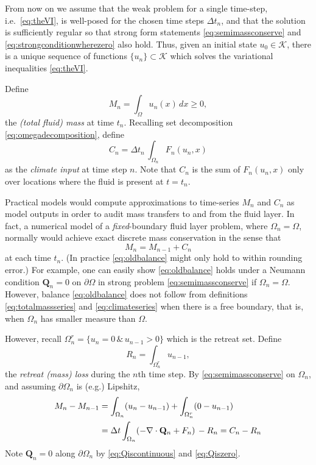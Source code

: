 \documentclass[final,leqno,onefignum,onetabnum]{siamltex1213bueler}
\newcommand\bQ{\mathbf{Q}}
\newcommand{\Div}{\nabla\cdot}
\begin{document}
From now on we assume that the weak problem for a single time-step, i.e.~\eqref{eq:theVI}, is well-posed for the chosen time steps $\Delta t_n$, and that the solution is sufficiently regular so that strong form statements \eqref{eq:semimassconserve} and \eqref{eq:strongconditionwherezero} also hold.  Thus, given an initial state $u_0\in\mathcal{K}$, there is a unique sequence of functions $\{u_n\} \subset \mathcal{K}$ which solves the variational inequalities \eqref{eq:theVI}.

Define
\begin{equation}
M_n = \int_\Omega u_n(x)\,dx \ge 0, \label{eq:totalmassseries}
\end{equation}
the \emph{(total fluid) mass} at time $t_n$.  Recalling set decomposition \eqref{eq:omegadecomposition}, define
\begin{equation}
C_n = \Delta t_n\, \int_{\Omega_n} F_n(u_n,x) \label{eq:climateseries}
\end{equation}
as the \emph{climate input} at time step $n$.  Note that $C_n$ is the sum of $F_n(u_n,x)$ only over locations where the fluid is present at $t=t_n$.

Practical models would compute approximations to time-series $M_n$ and $C_n$ as model outputs in order to audit mass transfers to and from the fluid layer.  In fact, a numerical model of a \emph{fixed}-boundary fluid layer problem, where $\Omega_n=\Omega$, normally would achieve exact discrete mass conservation in the sense that
\begin{equation}
M_n = M_{n-1} + C_n \label{eq:oldbalance}
\end{equation}
at each time $t_n$.  (In practice \eqref{eq:oldbalance} might only hold to within rounding error.)  For example, one can easily show \eqref{eq:oldbalance} holds under a Neumann condition $\bQ_n=0$ on $\partial \Omega$ in strong problem \eqref{eq:semimassconserve} if $\Omega_n=\Omega$.  However, balance \eqref{eq:oldbalance} does not follow from definitions \eqref{eq:totalmassseries} and \eqref{eq:climateseries} when there is a free boundary, that is, when $\Omega_n$ has smaller measure than $\Omega$.

However, recall $\Omega_n^r=\{u_n = 0 \,\&\,u_{n-1}>0\}$ which is the retreat set.  Define
\begin{equation}
R_n = \int_{\Omega_n^r} u_{n-1}, \label{eq:retreatlossseries}
\end{equation}
the \emph{retreat (mass) loss} during the $n$th time step.  By \eqref{eq:semimassconserve} on $\Omega_n$, and assuming $\partial \Omega_n$ is (e.g.) Lipshitz,
\begin{align}
M_n - M_{n-1} &= \int_{\Omega_n} (u_n - u_{n-1}) + \int_{\Omega_n^r} (0 - u_{n-1}) \label{eq:newbalance} \\
   &= \Delta t \int_{\Omega_n} (- \Div \bQ_n + F_n) \, - R_n = C_n - R_n \notag
\end{align}
Note $\bQ_n=0$ along $\partial \Omega_n$ by \eqref{eq:Qiscontinuous} and \eqref{eq:Qiszero}.
\end{document}

